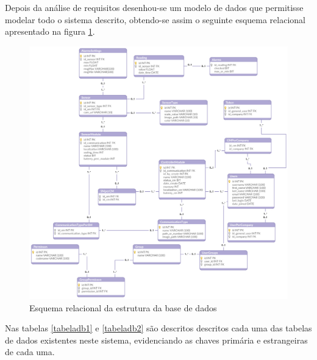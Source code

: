 Depois da análise de requisitos desenhou-se um modelo de dados que permitisse modelar todo o sistema descrito, obtendo-se assim o seguinte esquema relacional apresentado na figura \ref{esquemarelacional}.





\begin{figure}[!htb]
	\centering
	\includegraphics[width=\linewidth]{esquemas/database_tese.pdf}
	\caption{Esquema relacional da estrutura da base de dados}
	\label{esquemarelacional}
\end{figure}


Nas tabelas \ref{tabeladb1} e \ref{tabeladb2} são descritos descritos cada uma das tabelas de dados existentes neste sistema, evidenciando as chaves primária e estrangeiras de cada uma. 



